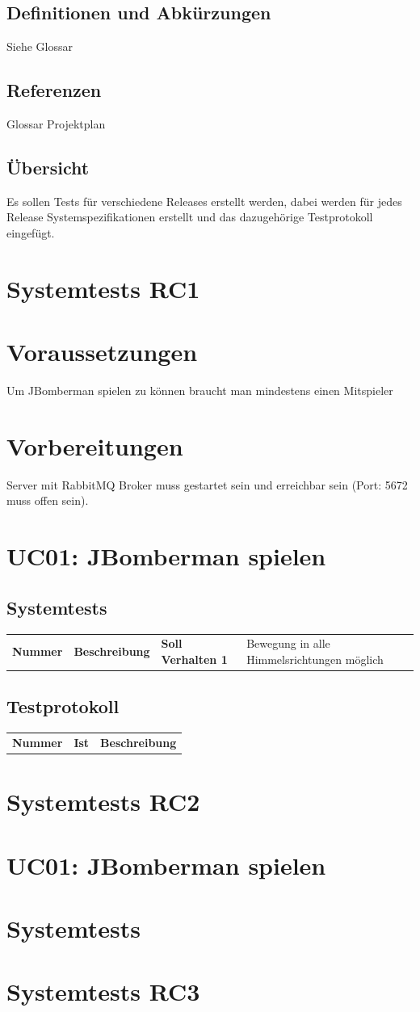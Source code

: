 \documentclass[11pt]{scrartcl}
\begin{document}
\subsection{Definitionen und Abkürzungen}
Siehe Glossar
\subsection{Referenzen}
Glossar
Projektplan
\subsection{Übersicht}
Es sollen Tests für verschiedene Releases erstellt werden, dabei werden für 
jedes Release Systemspezifikationen erstellt und das dazugehörige Testprotokoll 
eingefügt.
\section{Systemtests RC1}
\section{Voraussetzungen}
Um JBomberman spielen zu können braucht man mindestens einen Mitspieler
\section{Vorbereitungen}
Server mit RabbitMQ Broker muss gestartet sein und erreichbar sein 
(Port: 5672 muss offen sein).
\section{UC01: JBomberman spielen}
\subsection{Systemtests}
\begin{tabularx}{\linewidth}{l X X}
  \bf{Nummer} & \bf{Beschreibung} & \bf{Soll Verhalten}
  1 & Bewegung in alle Himmelsrichtungen möglich & 
\end{tabularx}

\subsection{Testprotokoll}
\begin{tabularx}{\linewidth}{l X X}
  \bf{Nummer} & \bf{Ist} & \bf{Beschreibung}
  
\end{tabularx}

\section{Systemtests RC2}
\section{UC01: JBomberman spielen}
\section{Systemtests}
\section{Systemtests RC3}
\end{document}
